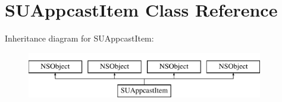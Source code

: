 \hypertarget{interface_s_u_appcast_item}{}\section{S\+U\+Appcast\+Item Class Reference}
\label{interface_s_u_appcast_item}
Inheritance diagram for S\+U\+Appcast\+Item\+:\begin{figure}[H]
\begin{center}
\leavevmode
\includegraphics[height=2.000000cm]{interface_s_u_appcast_item}
\end{center}
\end{figure}

